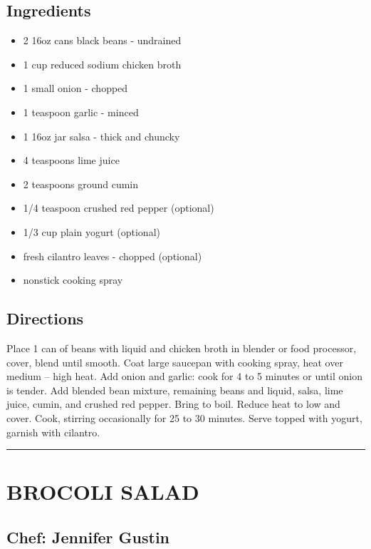 \documentclass[
]{book}
\providecommand{\tightlist}{%
  \setlength{\itemsep}{0pt}\setlength{\parskip}{0pt}}
\begin{document}
\hypertarget{ingredients-13}{%
\subsection*{Ingredients}\label{ingredients-13}}


\begin{itemize}
\tightlist
\item
  2 16oz cans black beans - undrained
\item
  1 cup reduced sodium chicken broth
\item
  1 small onion - chopped
\item
  1 teaspoon garlic - minced
\item
  1 16oz jar salsa - thick and chuncky
\item
  4 teaspoons lime juice
\item
  2 teaspoons ground cumin
\item
  1/4 teaspoon crushed red pepper (optional)
\item
  1/3 cup plain yogurt (optional)
\item
  fresh cilantro leaves - chopped (optional)
\item
  nonstick cooking spray
\end{itemize}

\hypertarget{directions-13}{%
\subsection*{Directions}\label{directions-13}}


Place 1 can of beans with liquid and chicken broth in blender or food processor, cover, blend until smooth. Coat large saucepan with cooking spray, heat over medium -- high heat. Add onion and garlic: cook for 4 to 5 minutes or until onion is tender. Add blended bean mixture, remaining beans and liquid, salsa, lime juice, cumin, and crushed red pepper. Bring to boil. Reduce heat to low and cover. Cook, stirring occasionally for 25 to 30 minutes. Serve topped with yogurt, garnish with cilantro.

\begin{center}\rule{0.5\linewidth}{0.5pt}\end{center}

\hypertarget{brocoli-salad}{%
\section*{BROCOLI SALAD}\label{brocoli-salad}}


\hypertarget{chef-jennifer-gustin-3}{%
\subsection*{Chef: Jennifer Gustin}\label{chef-jennifer-gustin-3}}
\end{document}
